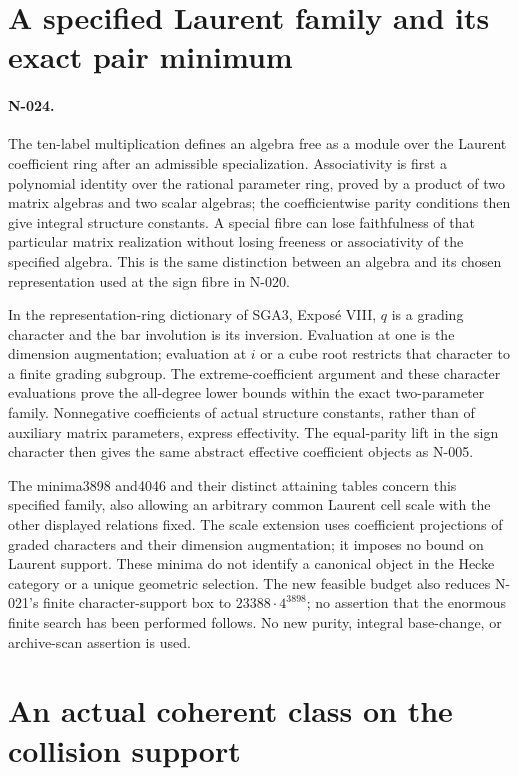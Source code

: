\section{A specified Laurent family and its exact pair minimum}
\paragraph{N-024.}
The ten-label multiplication defines an algebra free as a module over
the Laurent coefficient ring after an admissible specialization. Associativity
is first a polynomial identity over the rational parameter ring,
proved by a product of two matrix algebras and two scalar algebras;
the coefficientwise parity conditions then give integral structure
constants. A special fibre can lose faithfulness of that particular
matrix realization without losing freeness or associativity of the
specified algebra. This is the same distinction between an algebra
and its chosen representation used at the sign fibre in N-020.

In the representation-ring dictionary of SGA3, Expos\'e VIII,
$q$ is a grading character and the bar involution is its inversion.
Evaluation at one is the dimension augmentation; evaluation at
$i$ or a cube root restricts that character to a finite grading
subgroup. The extreme-coefficient argument and these character
evaluations prove the all-degree lower bounds within the exact
two-parameter family. Nonnegative coefficients of actual structure
constants, rather than of auxiliary matrix parameters, express
effectivity. The equal-parity lift in the sign character then gives
the same abstract effective coefficient objects as N-005.

The minima3898 and4046 and their distinct attaining tables concern
this specified family, also allowing an arbitrary common Laurent
cell scale with the other displayed relations fixed. The scale
extension uses coefficient projections of graded characters and
their dimension augmentation; it imposes no bound on Laurent
support. These minima do not identify a canonical object in
the Hecke category or a unique geometric selection. The new feasible
budget also reduces N-021's finite character-support box to
$23388\cdot4^{3898}$; no assertion that the enormous finite search
has been performed follows. No new purity, integral base-change,
or archive-scan assertion is used.

\section{An actual coherent class on the collision support}

